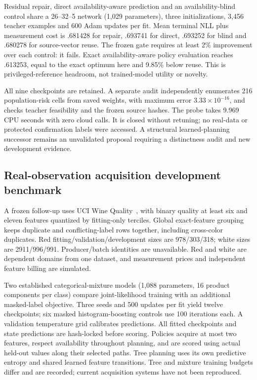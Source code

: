 \documentclass[10pt]{article}
\begin{document}
Residual repair, direct availability-aware prediction and an availability-blind control share a 26--32--5 network (1,029 parameters), three initializations, 3,456 teacher examples and 600 Adam updates per fit. Mean terminal NLL plus measurement cost is .681428 for repair, .693741 for direct, .693252 for blind and .680278 for source-vector reuse. The frozen gate requires at least 2\% improvement over each control: it fails. Exact availability-aware policy evaluation reaches .613253, equal to the exact optimum here and 9.85\% below reuse. This is privileged-reference headroom, not trained-model utility or novelty.

All nine checkpoints are retained. A separate audit independently enumerates 216 population-risk cells from saved weights, with maximum error $3.33\times10^{-16}$, and checks teacher feasibility and the frozen source hashes. The probe takes 9.969 CPU seconds with zero cloud calls. It is closed without retuning; no real-data or protected confirmation labels were accessed. A structural learned-planning successor remains an unvalidated proposal requiring a distinctness audit and new development evidence.

\subsection{Real-observation acquisition development benchmark}
A frozen follow-up uses UCI Wine Quality~\cite{winequality}, with binary quality at least six and eleven features quantized by fitting-only terciles. Global exact-feature grouping keeps duplicate and conflicting-label rows together, including cross-color duplicates. Red fitting/validation/development sizes are 978/303/318; white sizes are 2911/996/991. Producer/batch identities are unavailable. Red and white are dependent domains from one dataset, and measurement prices and independent feature billing are simulated.

Two established categorical-mixture models (1,088 parameters, 16 product components per class) compare joint-likelihood training with an additional masked-label objective. Three seeds and 500 updates per fit yield twelve checkpoints; six masked histogram-boosting controls use 100 iterations each. A validation temperature grid calibrates predictions. All fitted checkpoints and state predictions are hash-locked before scoring. Policies acquire at most two features, respect availability throughout planning, and are scored using actual held-out values along their selected paths. Tree planning uses its own predictive entropy and shared learned feature transitions. Tree and mixture training budgets differ and are recorded; current acquisition systems have not been reproduced.
\end{document}
